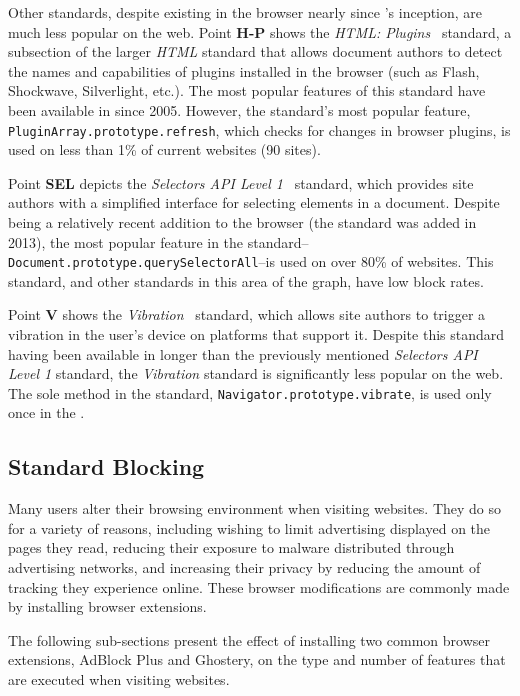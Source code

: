 Other standards, despite existing in the browser nearly since \FF's inception,
are much less popular on the web.  Point \textbf{H-P} shows the \textit{HTML:
Plugins}~\cite{htmlpluginsw3c} standard, a subsection of the larger \textit{HTML}
standard that allows document authors to detect the names and capabilities of
plugins installed in the browser (such as Flash, Shockwave, Silverlight, etc.).
The most popular features of this standard have been available in \FF since
2005.  However, the standard's most popular feature,
\texttt{PluginArray.prototype.refresh}, which checks for changes in browser
plugins, is used on less than 1\% of current websites (90 sites).

Point \textbf{SEL} depicts the \textit{Selectors API Level
1}~\cite{selectors1w3c} standard, which provides site authors with a simplified
interface for selecting elements in a document.  Despite being a relatively
recent addition to the browser (the standard was added in 2013), the most
popular feature in the
standard--\texttt{Document.prototype.querySelectorAll}--is used on over 80\% of
websites.  This standard, and other standards in this area of the graph, have
low block rates.

Point \textbf{V} shows the \textit{Vibration}~\cite{vibrationapi} standard,
which allows site authors to trigger a vibration in the user's device on
platforms that support it.  Despite this standard having been available in \FF
longer than the previously mentioned \textit{Selectors API Level 1} standard,
the \textit{Vibration} standard is significantly less popular on the web.  The
sole method in the standard, \texttt{Navigator.prototype.vibrate}, is used only
once in the \ATK.


\subsection{Standard Blocking}
\label{sec:results-feature-blocking}
Many users alter their browsing environment when visiting websites.  They do so
for a variety of reasons, including wishing to limit advertising displayed on
the pages they read, reducing their exposure to malware distributed through
advertising networks, and increasing their privacy by reducing the amount of
tracking they experience online.  These browser modifications are commonly
made by installing browser extensions.

The following sub-sections present the effect of installing two common browser
extensions, AdBlock Plus and Ghostery, on the type and number of features that
are executed when visiting websites.



